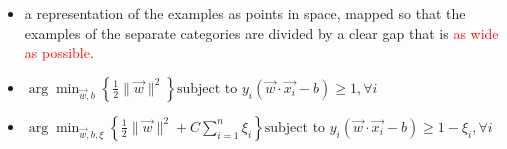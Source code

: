 \documentclass{beamer}
\begin{document}
\begin{frame}
	\begin{itemize}
		\item a representation of the examples as points in space, mapped so that the examples of the separate categories are divided by a clear gap that is \textcolor{red}{as wide as possible}. 
		\item $\arg\min_{\vec{w},b} \left\{\frac 1 2 \lVert \vec{w} \rVert^2 \right\} \text{subject to } y_i(\vec{w}\cdot\vec{x_i}-b) \geq 1, \forall i$	
		\item $\arg\min_{\vec{w},b,\xi} \left\{\frac 1 2 \lVert \vec{w} \rVert^2 + C\sum_{i=1}^{n}\xi_i \right\} \text{subject to } y_i(\vec{w}\cdot\vec{x_i}-b) \geq 1-\xi_i, \forall i$	
			
	\end{itemize}	
	
	
\end{frame}
\end{document}
